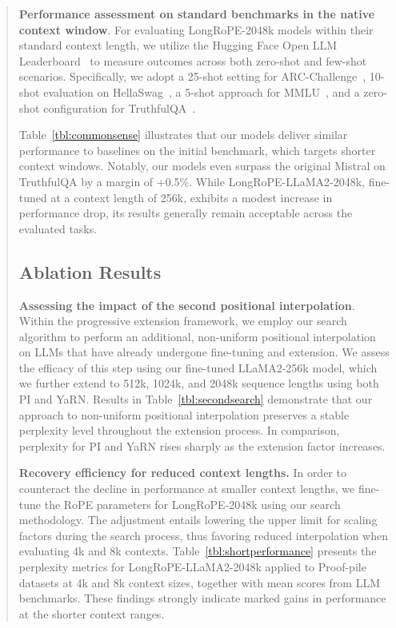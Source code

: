 \begin{abstract}
\textbf{Performance assessment on standard benchmarks in the native context window}. For evaluating LongRoPE-2048k models within their standard context length, we utilize the Hugging Face Open LLM Leaderboard~\cite{huggingfaceboard} to measure outcomes across both zero-shot and few-shot scenarios. Specifically, we adopt a 25-shot setting for ARC-Challenge~\cite{allenai:arc}, 10-shot evaluation on HellaSwag~\cite{zellers2019hellaswag}, a 5-shot approach for MMLU~\cite{mmlu}, and a zero-shot configuration for TruthfulQA~\cite{lin2021truthfulqa}.

Table~\ref{tbl:commonsense} illustrates that our models deliver similar performance to baselines on the initial benchmark, which targets shorter context windows. Notably, our models even surpass the original Mistral on TruthfulQA by a margin of +0.5\%. While LongRoPE-LLaMA2-2048k, fine-tuned at a context length of 256k, exhibits a modest increase in performance drop, its results generally remain acceptable across the evaluated tasks.

\subsection{Ablation Results}

\textbf{Assessing the impact of the second positional interpolation}. Within the progressive extension framework, we employ our search algorithm to perform an additional, non-uniform positional interpolation on LLMs that have already undergone fine-tuning and extension. We assess the efficacy of this step using our fine-tuned LLaMA2-256k model, which we further extend to 512k, 1024k, and 2048k sequence lengths using both PI and YaRN. Results in Table~\ref{tbl:secondsearch} demonstrate that our approach to non-uniform positional interpolation preserves a stable perplexity level throughout the extension process. In comparison, perplexity for PI and YaRN rises sharply as the extension factor increases.

\textbf{Recovery efficiency for reduced context lengths.} In order to counteract the decline in performance at smaller context lengths, we fine-tune the RoPE parameters for LongRoPE-2048k using our search methodology. The adjustment entails lowering the upper limit for scaling factors during the search process, thus favoring reduced interpolation when evaluating 4k and 8k contexts. Table~\ref{tbl:shortperformance} presents the perplexity metrics for LongRoPE-LLaMA2-2048k applied to Proof-pile datasets at 4k and 8k context sizes, together with mean scores from LLM benchmarks. These findings strongly indicate marked gains in performance at the shorter context ranges.


\end{abstract}

